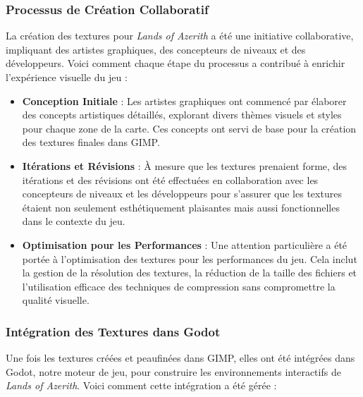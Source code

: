 \subsubsection{Processus de Création Collaboratif}

La création des textures pour \textit{Lands of Azerith} a été une initiative collaborative, impliquant des artistes graphiques, des concepteurs de niveaux et des développeurs.
Voici comment chaque étape du processus a contribué à enrichir l'expérience visuelle du jeu :
\\

\begin{itemize}
      \item \textbf{Conception Initiale} : Les artistes graphiques ont commencé par élaborer des concepts artistiques détaillés, explorant divers thèmes visuels et styles pour chaque zone de la carte. Ces concepts ont servi de base pour la création des textures finales dans GIMP.
            \\

      \item \textbf{Itérations et Révisions} : À mesure que les textures prenaient forme, des itérations et des révisions ont été effectuées en collaboration avec les concepteurs de niveaux et les développeurs pour s'assurer que les textures étaient non seulement esthétiquement plaisantes mais aussi fonctionnelles dans le contexte du jeu.
            \\

      \item \textbf{Optimisation pour les Performances} : Une attention particulière a été portée à l'optimisation des textures pour les performances du jeu. Cela inclut la gestion de la résolution des textures, la réduction de la taille des fichiers et l'utilisation efficace des techniques de compression sans compromettre la qualité visuelle.
\end{itemize}

\subsubsection{Intégration des Textures dans Godot}

Une fois les textures créées et peaufinées dans GIMP, elles ont été intégrées dans Godot, notre moteur de jeu,
pour construire les environnements interactifs de \textit{Lands of Azerith}. Voici comment cette intégration a été gérée :
\\

